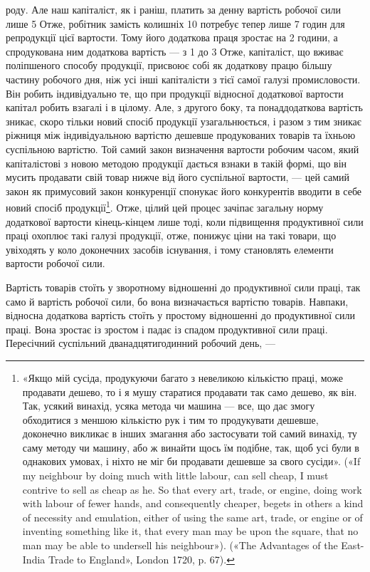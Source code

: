 роду. Але наш капіталіст, як і раніш, платить за денну вартість
робочої сили лише 5 Отже, робітник замість колишніх
10 потребує тепер лише 7 годин для репродукції цієї вартости.
Тому його додаткова праця зростає на 2 години, а спродукована
ним додаткова вартість — з 1 до 3 Отже, капіталіст,
що вживає поліпшеного способу продукції, присвоює собі як додаткову працю більшу
частину робочого дня, ніж усі інші капіталісти
з тієї самої галузі промисловости. Він робить індивідуально те,
що при продукції відносної додаткової вартости капітал робить
взагалі і в цілому. Але, з другого боку, та понаддодаткова вартість
зникає, скоро тільки новий спосіб продукції узагальнюється, і
разом з тим зникає ріжниця між індивідуальною вартістю дешевше
продукованих товарів та їхньою суспільною вартістю. Той самий
закон визначення вартости робочим часом, який капіталістові
з новою методою продукції дається взнаки в такій формі, що він
мусить продавати свій товар нижче від його суспільної вартости, — цей самий
закон як примусовий закон конкуренції спонукає його конкурентів вводити в себе
новий спосіб продукції\footnote{
«Якщо мій сусіда, продукуючи багато з невеликою кількістю праці,
може продавати дешево, то і я мушу старатися продавати так само дешево,
як він. Так, усякий винахід, усяка метода чи машина — все, що дає змогу
обходитися з меншою кількістю рук і тим то продукувати дешевше, доконечно
викликає в інших змагання або застосувати той самий винахід,
ту саму методу чи машину, або ж винайти щось їм подібне, так, щоб
усі були в однакових умовах, і ніхто не міг би продавати дешевше за свого
сусіди». («If my neighbour by doing much with little labour, can sell
cheap, I must contrive to sell as cheap as he. So that every art, trade, or
engine, doing work with labour of fewer hands, and consequently cheaper,
begets in others a kind of necessity and emulation, either of using the same
art, trade, or engine or of inventing something like it, that every man
may be upon the square, that no man may be able to undersell his neighbour»).
(«The Advantages of the East-India Trade to England», London 1720, p. 67).
}. Отже, цілий цей процес зачіпає загальну норму додаткової вартости
кінець-кінцем лише тоді, коли підвищення продуктивної
сили праці охоплює такі галузі продукції, отже, понижує ціни
на такі товари, що увіходять у коло доконечних засобів існування,
і тому становлять елементи вартости робочої сили.

Вартість товарів стоїть у зворотному відношенні до продуктивної сили праці,
так само й вартість робочої сили, бо вона
визначається вартістю товарів. Навпаки, відносна додаткова
вартість стоїть у простому відношенні до продуктивної сили праці.
Вона зростає із зростом і падає із спадом продуктивної сили праці.
Пересічний суспільний дванадцятигодинний робочий день, —
\parbreak{}  %
